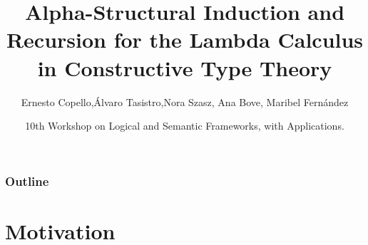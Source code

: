 \message{ !name(diapositivas.tex)}\documentclass[utf,utf8x,hyperref=hidelinks]{beamer}
\begin{document}


\title{Alpha-Structural Induction and Recursion for the Lambda Calculus in Constructive Type Theory}
\author{Ernesto Copello,\'Alvaro Tasistro,Nora Szasz, Ana Bove, Maribel Fern\'andez}

\date[LSFA ’15]{10th Workshop on Logical and Semantic Frameworks, with Applications.}

\begin{frame}
\titlepage
\end{frame}

\begin{frame}
\frametitle{Outline}
\tableofcontents
\end{frame}

\section{Motivation}
\end{document}

